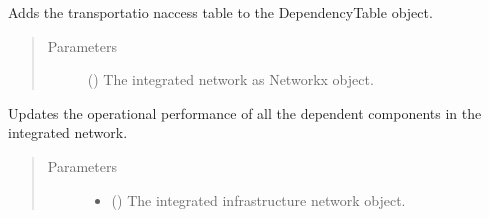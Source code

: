 \documentclass[letterpaper,10pt,english]{sphinxmanual}
\begin{document}
\begin{fulllineitems}
\begin{fulllineitems}
\begin{quote}
\begin{description}
\end{description}\end{quote}

\end{fulllineitems}


\begin{fulllineitems}
\label{\detokenize{apidoc:dreaminsg_integrated_model.src.network_sim_models.interdependencies.DependencyTable.build_transportation_access}}
\sphinxAtStartPar
Adds the transportatio naccess table to the DependencyTable object.
\begin{quote}\begin{description}
\item[{Parameters}] \leavevmode
\sphinxAtStartPar
{} () \textendash{} The integrated network as Networkx object.

\end{description}\end{quote}

\end{fulllineitems}


\begin{fulllineitems}
\label{\detokenize{apidoc:dreaminsg_integrated_model.src.network_sim_models.interdependencies.DependencyTable.update_dependencies}}
\sphinxAtStartPar
Updates the operational performance of all the dependent components in the integrated network.
\begin{quote}\begin{description}
\item[{Parameters}] \leavevmode\begin{itemize}
\item {} 
\sphinxAtStartPar
{} () \textendash{} The integrated infrastructure network object.


\end{itemize}
\end{description}
\end{quote}
\end{fulllineitems}
\end{fulllineitems}
\end{document}
